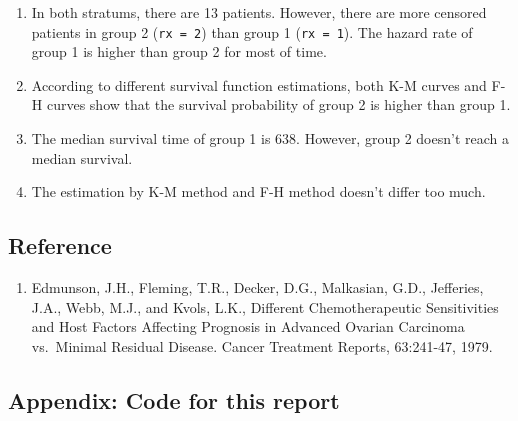 \documentclass[
]{article}
\providecommand{\tightlist}{%
  \setlength{\itemsep}{0pt}\setlength{\parskip}{0pt}}
\begin{document}
\begin{enumerate}
\def\labelenumi{\arabic{enumi}.}
\item
  In both stratums, there are 13 patients. However, there are more
  censored patients in group 2 (\texttt{rx\ =\ 2}) than group 1
  (\texttt{rx\ =\ 1}). The hazard rate of group 1 is higher than group 2
  for most of time.
\item
  According to different survival function estimations, both K-M curves
  and F-H curves show that the survival probability of group 2 is higher
  than group 1.
\item
  The median survival time of group 1 is 638. However, group 2 doesn't
  reach a median survival.
\item
  The estimation by K-M method and F-H method doesn't differ too much.
\end{enumerate}

\hypertarget{reference}{%
\subsection{Reference}\label{reference}}

\begin{enumerate}
\def\labelenumi{\arabic{enumi}.}
\tightlist
\item
  Edmunson, J.H., Fleming, T.R., Decker, D.G., Malkasian, G.D.,
  Jefferies, J.A., Webb, M.J., and Kvols, L.K., Different
  Chemotherapeutic Sensitivities and Host Factors Affecting Prognosis in
  Advanced Ovarian Carcinoma vs.~Minimal Residual Disease. Cancer
  Treatment Reports, 63:241-47, 1979.
\end{enumerate}

\hypertarget{appendix-code-for-this-report}{%
\subsection{Appendix: Code for this
report}\label{appendix-code-for-this-report}}
\end{document}
